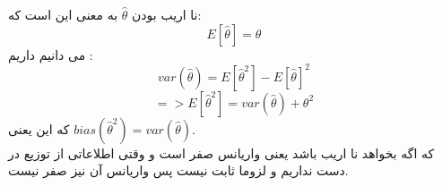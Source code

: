  \problem{}
 نا اریب بودن $\hat{\theta}$
 به معنی این است که:\\
 \[
    E[\hat{\theta}] = \theta   
 \]
 می دانیم داریم :\\
 \[
    var(\hat{\theta}) = E[{\hat{\theta}}^2] - E[\hat{\theta}]^2
 \]
 \[
    => E[{\hat{\theta}}^2] = var(\hat{\theta})  + {\theta}^2
 \]
 که این یعنی $bias(\hat{\theta}^2) = var(\hat{\theta})$.\\
که اگه بخواهد نا اریب باشد یعنی واریانس صفر است و وقتی اطلاعاتی از توزیع در دست نداریم
و لزوما ثابت نیست پس واریانس آن نیز صفر نیست.